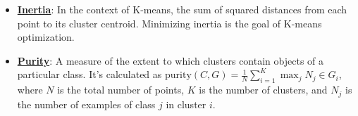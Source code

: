 \documentclass{article}%
\begin{document}
\begin{itemize}[leftmargin=*]
\item \href{https://purdue.brightspace.com/d2l/common/assets/pdfjs-d2l-dist/1.0.14-legacy/web/viewer.html?file=\%2Fcontent\%2Fenforced\%2F1095467-wl.202510.CS.24300.001\%2F12L2-distance-clusters.pdf\%3Fou\%3D1095467\&lang=en-us\&container=d2l-fileviewer-rendered-pdf\&fullscreen=d2l-fileviewer-rendered-pdf-dialog\&height=667#page=33}{\textbf{Inertia}}: In the context of K-means, the sum of squared distances from each point to its cluster centroid. Minimizing inertia is the goal of K-means optimization.%
\item \href{https://purdue.brightspace.com/d2l/common/assets/pdfjs-d2l-dist/1.0.14-legacy/web/viewer.html?file=\%2Fcontent\%2Fenforced\%2F1095467-wl.202510.CS.24300.001\%2F12L2-distance-clusters.pdf\%3Fou\%3D1095467\&lang=en-us\&container=d2l-fileviewer-rendered-pdf\&fullscreen=d2l-fileviewer-rendered-pdf-dialog\&height=667#page=44}{\textbf{Purity}}: A measure of the extent to which clusters contain objects of a particular class. It's calculated as $\text{purity}(C, G) = \frac{1}{N} \sum_{i=1}^K \max_j N_j \in G_i$, where $N$ is the total number of points, $K$ is the number of clusters, and $N_j$ is the number of examples of class $j$ in cluster $i$.%
\end{itemize}%
\end{document}
